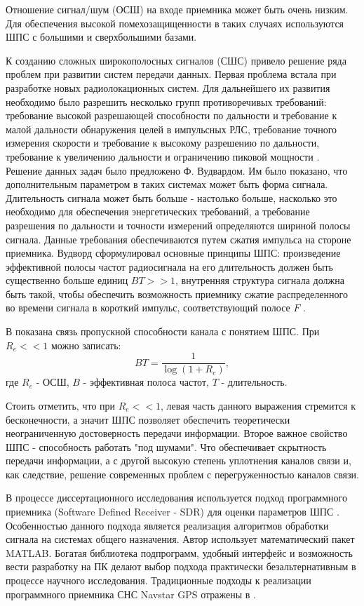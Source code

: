 Отношение сигнал/шум (ОСШ) на входе приемника может быть очень низким. Для обеспечения высокой помехозащищенности 
в таких случаях используются ШПС с большими и сверхбольшими базами.

К созданию сложных широкополосных сигналов (СШС) привело решение ряда проблем при развитии систем передачи данных.
Первая проблема встала при разработке новых радиолокационных систем. Для дальнейшего их развития необходимо было 
разрешить несколько групп противоречивых требований: требование высокой разрешающей способности по дальности и требование к малой дальности обнаружения
целей в импульсных РЛС, требование точного измерения скорости и требование к высокому разрешению по дальности, требование к
увеличению дальности и ограничению пиковой мощности \cite{gantmaher-book}. Решение данных задач было предложено
Ф. Вудвардом. Им было показано, что дополнительным параметром в таких системах может быть форма сигнала. Длительность сигнала
может быть больше - настолько больше, насколько это необходимо для обеспечения энергетических требований, а требование
разрешения по дальности и точности измерений определяются шириной полосы сигнала. Данные требования обеспечиваются
путем сжатия импульса на стороне приемника. Вудворд сформулировал основные принципы ШПС: произведение эффективной полосы частот
радиосигнала на его длительность должен быть существенно больше единиц ${BT>>1}$, внутренняя структура сигнала
должна быть такой, чтобы обеспечить возможность приемнику сжатие распределенного во времени сигнала в короткий импульс,
соответствующий полосе ${F}$ \cite{gantmaher-book}.

В \cite{gantmaher-book} показана связь пропускной способности канала с понятием ШПС. При ${R_e<<1}$ можно записать:
\begin{equation}
	BT = \frac{1}{\log(1+R_e)}, \nonumber
\end{equation}
где ${R_e}$ - ОСШ, ${B}$ - эффективная полоса частот, ${T}$ - длительность.

Стоить отметить, что при ${R_e<<1}$, левая часть данного выражения стремится к бесконечности, а значит
ШПС позволяет обеспечить теоретически неограниченную достоверность передачи информации. Второе важное свойство
ШПС - способность работать "под шумами". Что обеспечивает скрытность
передачи информации, а с другой высокую степень уплотнения каналов связи и, как следствие, решение современных проблем
с перегруженностью каналов связи.

В процессе диссертационного исследования используется подход программного приемника (Software Defined Receiver - SDR)
для оценки параметров ШПС \cite{akos-book, grayver-book, pany-book}. Особенностью данного подхода является реализация алгоритмов
обработки сигнала на системах общего назначения. Автор использует математический пакет MATLAB. Богатая библиотека подпрограмм, удобный интерфейс
и возможность вести разработку на ПК делают выбор подхода практически безальтернативным в процессе научного исследования.
Традиционные подходы к реализации программного приемника СНС Navstar GPS отражены в \cite{akos-book, tsui}. 

